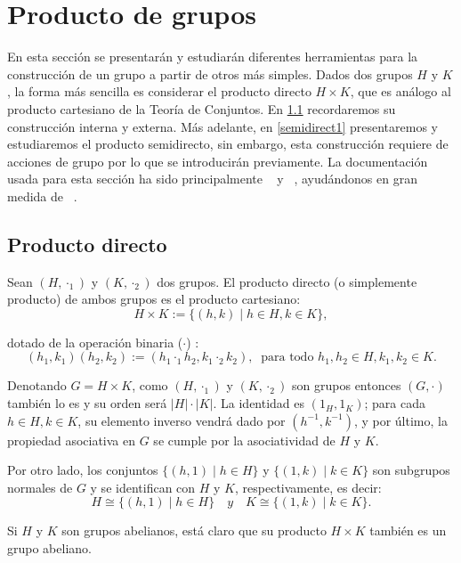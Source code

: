 
\chapter{Producto de grupos}
 
 
En esta sección se presentarán y estudiarán diferentes herramientas para la construcción de un grupo a partir de otros más simples. Dados dos grupos $H$ y $K$, la forma más sencilla es considerar el producto directo   $H \times K$, que es análogo al producto cartesiano de la Teoría de Conjuntos. En \ref{direct1} recordaremos su construcción interna y externa.  Más adelante, en \ref{semidirect1} presentaremos y estudiaremos el producto semidirecto, sin embargo, esta construcción requiere de acciones de grupo por lo que se introducirán previamente. La documentación usada para esta sección ha sido principalmente ~\cite{abstractrojo} y ~\cite{abstract}, ayudándonos en gran medida de ~\cite{eugenio}. 






\section{Producto directo} \label{direct1}


\begin{definition} \label{direct} 
Sean $(H,\cdot_1)$ y $(K, \cdot_2)$ dos grupos. El producto directo (o simplemente producto) de ambos grupos es el producto cartesiano:  
\[
H\times K :=\{(h,k) \mid  h \in H, k \in K \} ,
\]

dotado de la operación binaria ($\cdot$) :
\[
    (h_1,k_1) (h_2,k_2) :=(h_1 \cdot_1 h_2, k_1 \cdot_2 k_2), \: \text{ para todo } h_1,h_2\in H, k_1,k_2 \in K .
\]
\end{definition}

Denotando $G=H\times K$, como $(H, \cdot_1)$ y $(K, \cdot_2)$ son grupos entonces $(G,\cdot)$ también lo es y su orden será $|H|\cdot|K|$. La identidad es $(1_H, 1_K)$; para cada $h \in H, k \in K$, su elemento inverso vendrá dado por $(h^{-1},k^{-1})$, y por último, la propiedad asociativa en $G$ se cumple por la asociatividad de $H$ y $K$.

Por otro lado, los conjuntos $\{(h,1) \mid h \in H \}$ y $\{ (1,k) \mid k \in K\}$ son subgrupos normales de $G$ y se identifican con $H$ y $K$, respectivamente, es decir:
\[
    H \cong \{(h,1) \mid h \in H \} \quad y \quad  K \cong \{ (1,k) \mid k \in K\}.
\]

Si $H$ y $K$ son grupos abelianos, está claro que su producto $H\times K$ también es un grupo abeliano.


